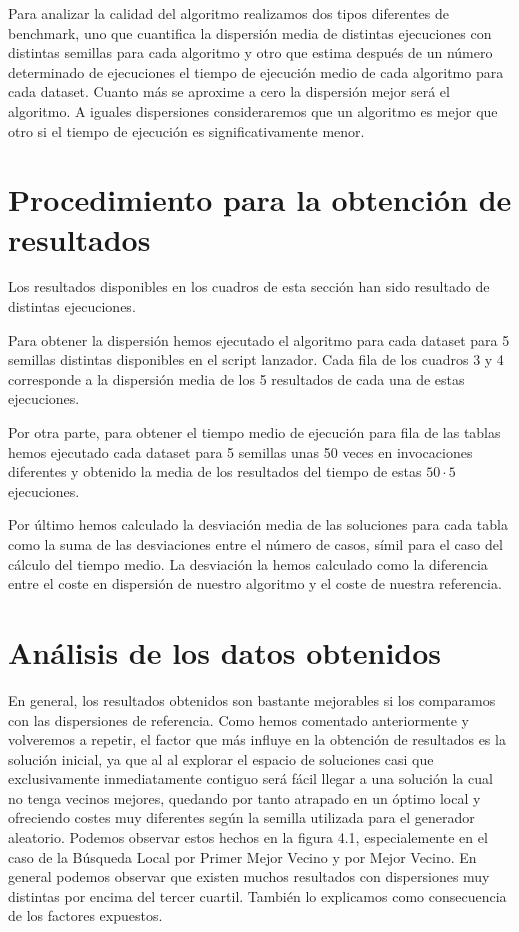 Para analizar la calidad del algoritmo realizamos dos tipos diferentes de benchmark, uno que cuantifica la dispersión
media de distintas ejecuciones con distintas semillas para cada algoritmo y otro que estima después de un número
determinado de ejecuciones el tiempo de ejecución medio de cada algoritmo para cada dataset. Cuanto más se aproxime
a cero la dispersión mejor será el algoritmo. A iguales dispersiones consideraremos que un algoritmo es mejor que otro
si el tiempo de ejecución es significativamente menor.

\section{Procedimiento para la obtención de resultados}

Los resultados disponibles en los cuadros de esta sección han sido resultado de distintas ejecuciones.

Para obtener la dispersión hemos ejecutado el algoritmo para cada dataset para 5 semillas distintas disponibles
en el script lanzador. Cada fila de los cuadros 3 y 4 corresponde a la dispersión media de los 5 resultados de cada
una de estas ejecuciones.

Por otra parte, para obtener el tiempo medio de ejecución para fila de las tablas hemos ejecutado cada dataset
para 5 semillas unas 50 veces en invocaciones diferentes y obtenido la media de los resultados del tiempo de estas
$ 50 \cdot 5 $ ejecuciones.

Por último hemos calculado la desviación media de las soluciones para cada tabla como la suma de las desviaciones
entre el número de casos, símil para el caso del cálculo del tiempo medio. La desviación la hemos calculado como la
diferencia entre el coste en dispersión de nuestro algoritmo y el coste de nuestra referencia.



\section{Análisis de los datos obtenidos}

En general, los resultados obtenidos son bastante mejorables si los comparamos con las dispersiones de referencia. Como hemos
comentado anteriormente y volveremos a repetir, el factor que más influye en la obtención de resultados es la solución inicial,
ya que al al explorar el espacio de soluciones casi que exclusivamente inmediatamente contiguo será fácil llegar a una solución
la cual no tenga vecinos mejores, quedando por tanto atrapado en un óptimo local y ofreciendo costes muy diferentes según la semilla
utilizada para el generador aleatorio.
Podemos observar estos hechos en la figura 4.1, especialemente en el caso de la Búsqueda Local por Primer Mejor Vecino y por Mejor Vecino.
En general podemos observar que existen muchos resultados con dispersiones muy distintas por encima del tercer cuartil. También lo explicamos
como consecuencia de los factores expuestos.

